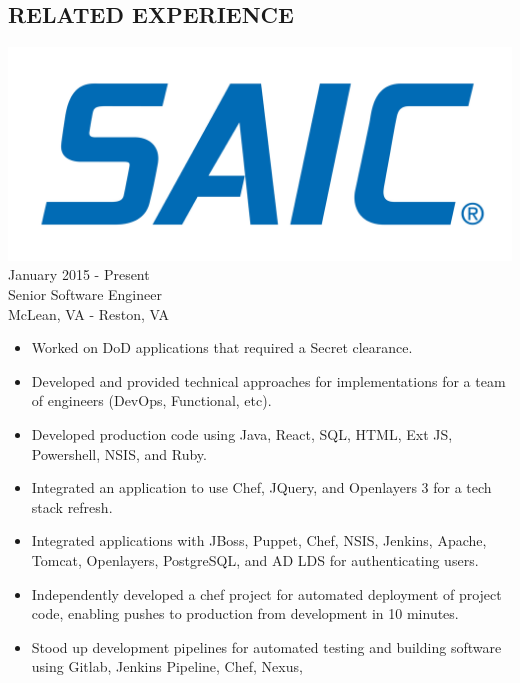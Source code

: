 \documentclass[12pt, line, margin]{res}
\begin{document}
\begin{resume}
\section{RELATED EXPERIENCE} {\sl  \includegraphics[scale=0.015, trim=110 200 110 120]{resume_images/SAIC_logo_RGB-lg.jpg}} \hfill January 2015 - Present \\
                Senior Software Engineer \\
                McLean, VA - Reston, VA
                 \begin{itemize}  \itemsep -2pt %
              \item   Worked on DoD applications that required a Secret clearance.
	      \item   Developed and provided technical approaches for \newline
	      		implementations for a team of engineers (DevOps, Functional, etc).
	      \item   Developed production code using Java, React, SQL, HTML, \newline
	      		Ext JS, Powershell, NSIS, and Ruby.
	      \item   Integrated an application to use Chef, JQuery, and 
			Openlayers 3 for a tech stack refresh.
	      \item   Integrated applications with JBoss, Puppet, Chef, NSIS, Jenkins,
	      		Apache, Tomcat, Openlayers, PostgreSQL, and AD LDS for 
			authenticating users.
	      \item   Independently developed a chef project for automated \newline 
			deployment of project code, enabling pushes to production \newline
			from development in 10 minutes.
	      \item   Stood up development pipelines for automated testing and \newline
		        building software using Gitlab, Jenkins Pipeline, Chef, Nexus,

\end{itemize}
\end{resume}
\end{document}
